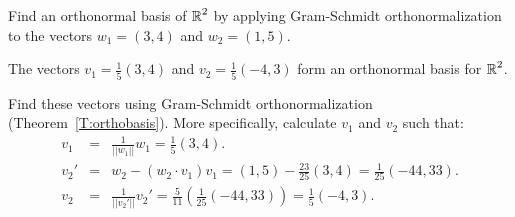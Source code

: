 \documentclass{ximera}
\begin{document}
\begin{exercise} \label{c7.5.1}
Find an orthonormal basis of $\mbox{$\mathbb{R}$}^2$ by applying Gram-Schmidt
orthonormalization to the vectors $w_1=(3,4)$ and $w_2=(1,5)$.

\begin{solution}

\ans The vectors $v_1 = \frac{1}{5}(3,4)$ and $v_2 = \frac{1}{5}(-4,3)$
form an orthonormal basis for $\mbox{$\mathbb{R}$}^2$.

\soln Find these vectors using Gram-Schmidt orthonormalization
(Theorem~\ref{T:orthobasis}).  More
specifically, calculate $v_1$ and $v_2$ such that:
\[
\begin{array}{rcl}
v_1 & = & \frac{1}{||w_1||}w_1 = \frac{1}{5}(3,4). \\
v_2' & = & w_2 - (w_2 \cdot v_1)v_1 = (1,5) - \frac{23}{25}(3,4)
= \frac{1}{25}(-44,33). \\
v_2 & = & \frac{1}{||v_2'||}v_2' = \frac{5}{11}
\left(\frac{1}{25}(-44,33)\right) = \frac{1}{5}(-4,3).
\end{array}
\]

\end{solution}
\end{exercise}
\end{document}
